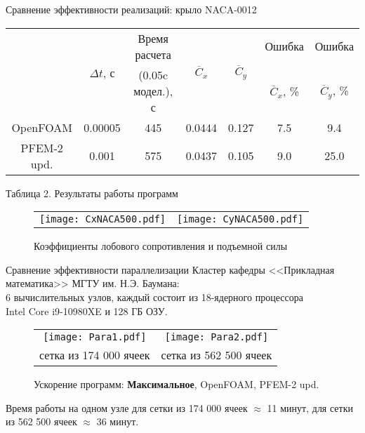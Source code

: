 \documentclass[9pt, ignoreonframetext,unicode]{beamer}
\begin{document}
\begin{frame}{Сравнение эффективности реализаций: крыло NACA-0012}
	
	\begin{center}
	\begin{tabular}{|c|c|c|c|c|c|c|}\hline	
		& \multirow{2}{*}{$\Delta t$, с}&Время расчета& \multirow{2}{*}{$\overline{C}_x$} & \multirow{2}{*}{$\overline{C}_y$} & Ошибка & Ошибка \\ 
		& &(0.05c модел.), с& & & $\overline{C}_x$, \%    & $\overline{C}_y$, \% \\ \hline
		{\color{red}OpenFOAM}& 0.00005		& 445 				  & 0.0444 & 0.127 & 7.5 & 9.4 \\ \hline
		{\color{blue}PFEM-2 upd.}& 0.001	& 575   				  & 0.0437 & 0.105 & 9.0 & 25.0\\ \hline
	\end{tabular}
\end{center}
\begin{center}
	Таблица 2. Результаты работы программ
\end{center}

	\vspace*{-2mm}
	\begin{figure}[!h]
		\centering
		\begin{tabular}{cc}
		\texttt{[image: CxNACA500.pdf]} & \texttt{[image: CyNACA500.pdf]} \\
		\end{tabular}
		\caption{Коэффициенты лобового сопротивления и подъемной силы}
		\label{picCx0}
	\end{figure}
	
\end{frame}

\begin{frame}{Сравнение эффективности параллелизации}
	Кластер кафедры <<Прикладная математика>> МГТУ им. Н.Э. Баумана: \\
	6 вычислительных узлов, каждый состоит из 18-ядерного процессора \\ Intel Core i9-10980XE и 128 ГБ ОЗУ.
	\begin{figure}[!h]
	\centering
	\begin{tabular}{cc}
		\texttt{[image: Para1.pdf]} & 	\texttt{[image: Para2.pdf]} \\
		сетка из 174 000 ячеек &  сетка из 562 500 ячеек 
	\end{tabular}
	\caption{Ускорение программ: \textbf{Максимальное}, {\color{red}OpenFOAM}, {\color{blue}PFEM-2 upd.}}
	\label{picAcc}
\end{figure}

Время работы на одном узле для сетки из 174 000 ячеек $\approx$ 11 минут, для сетки из 562 500 ячеек $\approx$ 36 минут.
\end{frame}
\end{document}
